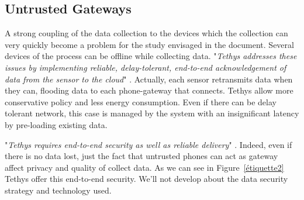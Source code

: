 \documentclass[10pt,journal,compsoc]{IEEEtran}
\begin{document}
\subsection{Untrusted Gateways}
A strong coupling of the data collection to the devices which the collection can very quickly become a problem for the study envisaged in the document. Several devices of the process can be offline while collecting data. "\emph{Tethys addresses these issues by implementing reliable, delay-tolerant, end-to-end acknowledgement of data from the sensor to the cloud}" \cite{IEEEhowto:}. Actually, each sensor retransmits data when they can, flooding data to each phone-gateway that connects. Tethys allow more conservative policy and less energy consumption. Even if there can be delay tolerant network, this case is managed by the system with an insignificant latency by pre-loading existing data.

"\emph{Tethys requires end-to-end security as well as reliable delivery}" \cite{IEEEhowto:}. Indeed, even if there is no data lost, just the fact that untrusted phones can act as gateway affect privacy and quality of collect data. As we can see in Figure~\ref{étiquette2} Tethys offer this end-to-end security. We'll not develop about the data security strategy and technology used.
\end{document}
